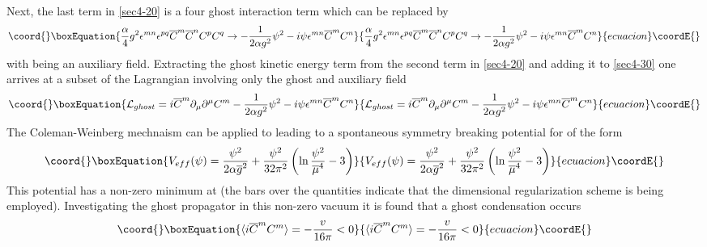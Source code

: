 \documentclass[a4paper,aps,showpacs]{revtex4}
\begin{document}
Next, the last term in \eqref{sec4-20} is a four ghost interaction term which can be replaced by
\cite{dudal} \cite{lemes}
\begin{equation}\coord{}\boxEquation{
\label{sec4-30}
\frac{\alpha}{4} g^2 \epsilon ^{mn} \epsilon ^{pq} {\overline{ C}}^m {\overline{ C}}^n C^p C^q
\rightarrow -\frac{1}{2 \alpha g^2} \psi ^2 - i \psi \epsilon ^{mn} {\overline{ C}}^m C^n
}{
\frac{\alpha}{4} g^2 \epsilon ^{mn} \epsilon ^{pq} {\overline{ C}}^m {\overline{ C}}^n C^p C^q
\rightarrow -\frac{1}{2 \alpha g^2} \psi ^2 - i \psi \epsilon ^{mn} {\overline{ C}}^m C^n
}{ecuacion}\coordE{}\end{equation}
with \myHighlight{$\psi$}\coordHE{} being an auxiliary field. Extracting the ghost kinetic energy term from the
second term in \eqref{sec4-20} and adding it to \eqref{sec4-30} one arrives at a
subset of the Lagrangian involving only the ghost and auxiliary field
\begin{equation}\coord{}\boxEquation{
\label{sec4-40}
{\mathcal L}_{ghost} = i {\overline{ C}}^m \partial _{\mu} \partial ^{\mu} C^m
-\frac{1}{2 \alpha g^2} \psi ^2 - i \psi \epsilon ^{mn} {\overline{ C}}^m C^n
}{
{\mathcal L}_{ghost} = i {\overline{ C}}^m \partial _{\mu} \partial ^{\mu} C^m
-\frac{1}{2 \alpha g^2} \psi ^2 - i \psi \epsilon ^{mn} {\overline{ C}}^m C^n
}{ecuacion}\coordE{}\end{equation}
The Coleman-Weinberg mechnaism \cite{coleman} can be applied to 
\coordHE{} leading to a spontaneous symmetry breaking
potential for \myHighlight{$\psi$}\coordHE{} of the form
\begin{equation}\coord{}\boxEquation{
\label{sec4-50}
V_{eff} (\psi ) = \frac{\psi ^2}{2 \alpha {\overline g}^2} + \frac{\psi ^2}{32 \pi ^2}
\left( \ln \frac{\psi ^2}{{\overline \mu} ^4} -3 \right)
}{
V_{eff} (\psi ) = \frac{\psi ^2}{2 \alpha {\overline g}^2} + \frac{\psi ^2}{32 \pi ^2}
\left( \ln \frac{\psi ^2}{{\overline \mu} ^4} -3 \right)
}{ecuacion}\coordE{}\end{equation}
This potential has a non-zero minimum at \coordHE{} (the bars over the quantities
indicate that the \coordHE{} dimensional regularization scheme is being employed).
Investigating the ghost propagator in this non-zero vacuum it is found \cite{dudal} 
that a ghost condensation occurs
\begin{equation}\coord{}\boxEquation{
\label{sec4-60}
\langle i {\overline{ C}} ^m C^m \rangle = -\frac{v}{16 \pi} <0
}{
\langle i {\overline{ C}} ^m C^m \rangle = -\frac{v}{16 \pi} <0
}{ecuacion}\coordE{}\end{equation}
\end{document}
